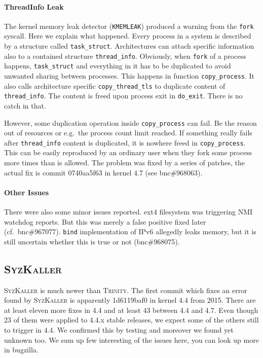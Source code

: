 \documentclass[10pt]{llncs}
\newcommand{\code}[2][]{\lstinline[columns=fullflexible, #1]$#2$}
\newcommand{\syz}{\textsc{SyzKaller}\xspace}
\newcommand{\trin}{\textsc{Trinity}\xspace}
\begin{document}
\paragraph{ThreadInfo Leak} The kernel memory leak detector
(\texttt{KMEMLEAK}) produced a warning from the \code{fork} syscall.  Here we
explain what happened.  Every process in a system is described by a structure
called \code{task_struct}.  Architectures can attach specific information also
to a contained structure \code{thread_info}. Obviously, when \code{fork} of a
process happens, \code{task_struct} and everything in it has to be duplicated
to avoid unwanted sharing between processes. This happens in function
\code{copy_process}. It also calls architecture specific
\code{copy_thread_tls} to duplicate content of \code{thread_info}. The content
is freed upon process exit in \code{do_exit}. There is no catch in that.

However, some duplication operation inside \code{copy_process} can fail. Be
the reason out of resources or e.g.\ the process count limit reached.  If
something really fails after \code{thread_info} content is duplicated, it is
nowhere freed in \code{copy_process}. This can be easily reproduced by an
ordinary user when they fork some process more times than is allowed. The
problem was fixed by a series of patches, the actual fix is commit 0740aa5f63
in kernel 4.7 (see bnc\#968063).

\paragraph{Other Issues} There were also some minor issues reported. ext4
filesystem was triggering NMI watchdog reports. But this was merely a false
positive fixed later (cf.\ bnc\#967077). \texttt{bind} implementation of IPv6
allegedly leaks memory, but it is still uncertain whether this is true or not
(bnc\#968075).

\subsection{\syz}
\syz is much newer than \trin. The first commit which fixes an error found by
\syz is apparently 1d6119baf0 in kernel 4.4 from 2015. There are at least
eleven more fixes in 4.4 and at least 43 between 4.4 and 4.7. Even though 23
of them were applied to 4.4.x stable releases, we expect some of the others
still to trigger in 4.4. We confirmed this by testing and moreover we found
yet unknown too. We sum up few interesting of the issues here, you can look up
more in bugzilla.
\end{document}
